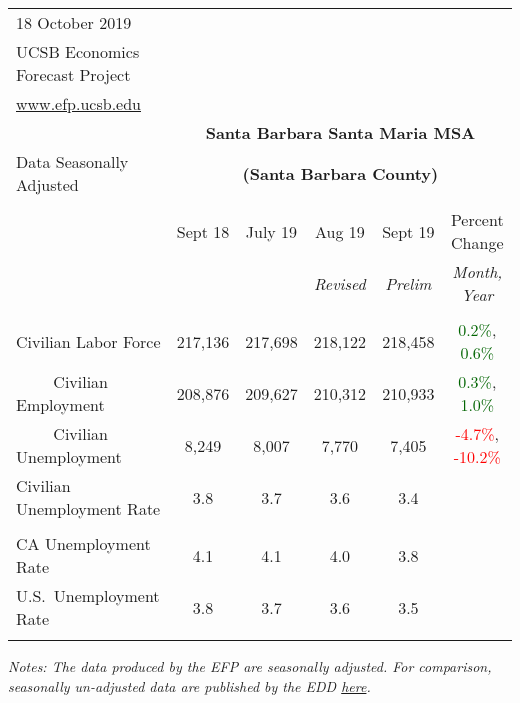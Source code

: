 \documentclass[12pt]{article}
\begin{document}
\begin{table}
\begin{tabular}{|l|c|c|c|c|c|}
\multicolumn{1}{l}{\small 18 October 2019} & \multicolumn{5}{c}{} \\
\multicolumn{1}{l}{\small UCSB Economics Forecast Project} & \multicolumn{5}{c}{} \\
\multicolumn{1}{l}{\small \href{http://www.efp.ucsb.edu/}{www.efp.ucsb.edu}} & \multicolumn{5}{c}{} \\
\multicolumn{1}{c}{} & \multicolumn{5}{c}{\large \textbf{Santa Barbara Santa Maria MSA}} \\
\multicolumn{1}{l}{\small Data Seasonally Adjusted} & \multicolumn{5}{c}{\small \textbf{(Santa Barbara County)}} \\ \hline \hline
& & & & & \\
 & Sept 18 & July 19 & Aug 19 & Sept 19 & Percent Change \\
 & & & \small \textit{Revised} & \small \textit{Prelim} & \small \textit{Month, Year} \\ \hline
& & & & & \\
Civilian Labor Force & 217,136 & 217,698 & 218,122 & 218,458 & \textcolor{darkgreen}{0.2\%}, \textcolor{darkgreen}{0.6\%} \\
$\qquad$ \small Civilian Employment & 208,876 & 209,627 & 210,312 & 210,933 & \textcolor{darkgreen}{0.3\%}, \textcolor{darkgreen}{1.0\%} \\
$\qquad$ \small Civilian Unemployment & 8,249 & 8,007 & 7,770 & 7,405 & \textcolor{red}{-4.7\%}, \textcolor{red}{-10.2\%} \\
Civilian Unemployment Rate & 3.8 & 3.7 & 3.6 & 3.4 & \\
& & & & & \\
CA Unemployment Rate & 4.1 & 4.1 & 4.0 & 3.8 & \\
U.S.\ Unemployment Rate & 3.8 & 3.7 & 3.6 & 3.5 & \\
& & & & & \\ \hline \hline
\end{tabular}
\par
\vspace{.5em}
\footnotesize
\textit{Notes: The data produced by the EFP are seasonally adjusted. For comparison, seasonally un-adjusted data are published by the EDD \href{http://www.labormarketinfo.ca.gov/file/lfmonth/satb$pds.pdf}{here}.}
\end{table}
\end{document}
